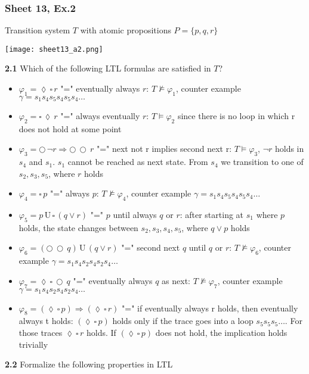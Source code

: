 \documentclass{article}
\def\unt{\, \text{U} \,}
\def\nex{\bigcirc \,}
\def\evt{\lozenge  \,}
\def\alw{\square \,}
\begin{document}
\subsubsection{Sheet 13, Ex.2}
Transition system $T$  with atomic propositions $P=\{p,q,r\}$
\begin{center}
    \texttt{[image: sheet13\_a2.png]}
\end{center}
\textbf{2.1} Which of the following LTL formulas are satisfied in $T$?
\begin{itemize}
    \item $\varphi_1 = \evt \alw r$ "=" eventually always $r$: $T \nvDash \varphi_1$, counter example $\gamma = s_1s_4s_5s_4s_5s_4\dots$
    \item $\varphi_2 = \alw \evt r$ "=" always eventually $r$: $T \vDash \varphi_2$ since there is no loop in which r does not hold at some point
    \item $\varphi_3 = \nex \lnot r \Rightarrow \nex \nex r$ "=" next not r implies second next r: $T \vDash \varphi_3$, $\lnot r$ holds in $s_4$ and $s_1$. $s_1$ cannot be reached as next state. From $s_4$ we transition to one of $s_2, s_3, s_5$, where $r$ holds
    \item $\varphi_4 = \alw p$ "=" always $p$: $T \nvDash \varphi_4$, counter example $\gamma = s_1s_4s_5s_4s_5s_4\dots$
    \item $\varphi_5 = p \unt \alw (q \lor r)$ "=" $p$ until always $q$ or $r$: after starting at $s_1$ where $p$ holds, the state changes between $s_2,s_3,s_4,s_5$, where $q \lor p$ holds
    \item $\varphi_6 = (\nex \nex q) \unt (q \lor r)$ "=" second next $q$ until $q$ or $r$: $T \nvDash \varphi_6$, counter example $\gamma = s_1s_4s_2s_4s_2s_4\dots$
    \item $\varphi_7 = \evt \alw \nex q$ "=" eventually always $q$ as next: $T \nvDash \varphi_7$, counter example $\gamma = s_1s_4s_2s_4s_2s_4\dots$
    \item $\varphi_8 = (\evt \alw p) \Rightarrow  (\evt \alw r)$ "=" if eventually always r holds, then eventually always t holds: $(\evt \alw p)$ holds only if the trace goes into a loop $s_5s_5s_5\dots$. For those traces $\evt \alw r$ holds. If $(\evt \alw p)$ does not hold, the implication holds trivially
\end{itemize}
\textbf{2.2} Formalize the following properties in LTL
\end{document}
